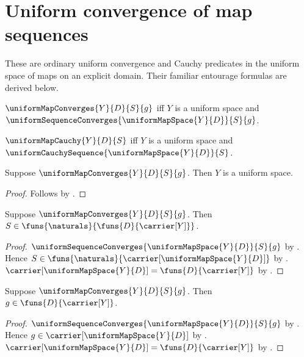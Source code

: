 





\section{Uniform convergence of map sequences}

These are ordinary uniform convergence and Cauchy predicates in the uniform
space of maps on an explicit domain.  Their familiar entourage formulas are
derived below.

\begin{definition}\label{uniform_map_convergence}
    $\uniformMapConverges{Y}{D}{S}{g}$ iff
        $Y$ is a uniform space and
        $\uniformSequenceConverges{\uniformMapSpace{Y}{D}}{S}{g}$.
\end{definition}

\begin{definition}\label{uniform_map_cauchy}
    $\uniformMapCauchy{Y}{D}{S}$ iff
        $Y$ is a uniform space and
        $\uniformCauchySequence{\uniformMapSpace{Y}{D}}{S}$.
\end{definition}

\begin{proposition}\label{uniform_map_convergence_target}
    Suppose $\uniformMapConverges{Y}{D}{S}{g}$.
    Then $Y$ is a uniform space.
\end{proposition}
\begin{proof}
    Follows by .
\end{proof}

\begin{proposition}\label{uniform_map_convergence_sequence}
    Suppose $\uniformMapConverges{Y}{D}{S}{g}$.
    Then $S\in\funs{\naturals}{\funs{D}{\carrier[Y]}}$.
\end{proposition}
\begin{proof}
    $\uniformSequenceConverges{\uniformMapSpace{Y}{D}}{S}{g}$ by
        .
    Hence $S\in\funs{\naturals}{\carrier[\uniformMapSpace{Y}{D}]}$ by
        .
    $\carrier[\uniformMapSpace{Y}{D}]=\funs{D}{\carrier[Y]}$ by
        .
\end{proof}

\begin{proposition}\label{uniform_map_convergence_limit}
    Suppose $\uniformMapConverges{Y}{D}{S}{g}$.
    Then $g\in\funs{D}{\carrier[Y]}$.
\end{proposition}
\begin{proof}
    $\uniformSequenceConverges{\uniformMapSpace{Y}{D}}{S}{g}$ by
        .
    Hence $g\in\carrier[\uniformMapSpace{Y}{D}]$ by
        .
    $\carrier[\uniformMapSpace{Y}{D}]=\funs{D}{\carrier[Y]}$ by
        .
\end{proof}

